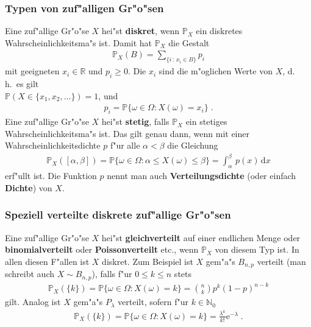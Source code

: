 \documentclass[ngerman,draft,parskip=half,twoside]{scrartcl}
\newcommand*{\R}{\mathbb{R}}      %
\newcommand*{\N}{\mathbb{N}}      %
\newcommand*{\WKM}{\mathbb{P}}      %
\begin{document}
\subsubsection{Typen von zuf"alligen Gr"o"sen}
Eine zuf"allige Gr"o"se $X$ hei"st \textbf{diskret}, wenn $\WKM_X$ ein diskretes
Wahrscheinlichkeitsma"s ist. Damit hat $\WKM_X$ die Gestalt
\begin{gather*}
  \WKM_X(B)=\sum_{\{i\, : \,x_i\in  B\}} p_i
\end{gather*}
mit geeigneten $x_i\in\R$ und $p_i\ge 0$. Die $x_i$ sind die m"oglichen Werte von $X$, d.\,h.~es
gilt\\ $\WKM(X\in\{x_1,x_2,\ldots\})=1$,
und
\begin{gather*}
  p_i=\WKM\{\omega\in\Omega : X(\omega)=x_i\}\;.
\end{gather*}
Eine zuf"allige Gr"o"se $X$ hei"st \textbf{stetig}, falls $\WKM_X$ ein stetiges Wahrscheinlichkeitsma"s
ist. Das gilt genau dann, wenn mit einer Wahrscheinlichkeitsdichte $p$ f"ur alle $\alpha<\beta$
die Gleichung
\begin{gather*}
  \WKM_X([\alpha,\beta])=\WKM\{\omega\in\Omega : \alpha\le X(\omega)\le\beta\}=\int_\alpha^\beta\,p(x)\,
     \mathrm d x
\end{gather*}
erf"ullt ist. Die Funktion $p$ nennt man auch \textbf{Verteilungsdichte} (oder einfach
\textbf{Dichte}) von $X$.
\subsubsection{Speziell verteilte diskrete zuf"allige Gr"o"sen}
Eine zuf"allige Gr"o"se $X$ hei"st \textbf{gleichverteilt}
 auf einer endlichen Menge oder \textbf{binomialverteilt}
oder \textbf{Poissonverteilt} etc., wenn $\WKM_X$ von diesem Typ ist. In allen diesen F"allen
ist $X$ diskret. Zum Beispiel ist $X$ gem"a"s $B_{n,p}$ verteilt (man schreibt auch
$X\sim B_{n,p}$), falls f"ur $0\le k\le n$ stets
\begin{gather*}
  \WKM_X(\{k\})=\WKM\{\omega\in\Omega : X(\omega)=k\} = {n \choose k} p^k(1-p)^{n-k}
\end{gather*}
gilt. Analog ist $X$ gem"a"s $P_\lambda$ verteilt, sofern f"ur $k\in\N_0$
\begin{gather*}
  \WKM_X(\{k\})=\WKM\{\omega\in\Omega : X(\omega)=k\}=\frac{\lambda^k}{k!}\mathrm e^{-\lambda}\;.
\end{gather*}
\end{document}
